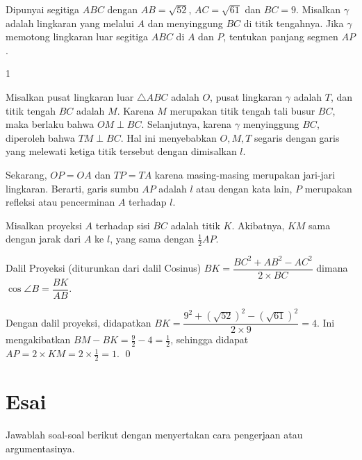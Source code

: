 \documentclass[11pt]{scrartcl}
\begin{document}
	\begin{soaljawab}
		Dipunyai segitiga $ABC$ dengan $AB = \sqrt{52}$, $AC=\sqrt{61}$ dan $BC = 9$. Misalkan $\gamma$
		adalah lingkaran yang melalui $A$ dan menyinggung $BC$ di titik tengahnya. Jika $\gamma$
		memotong lingkaran luar segitiga $ABC$ di $A$ dan $P$, tentukan panjang segmen $AP$.
		
		\begin{jawaban}
		1
		\end{jawaban}
		\begin{solusi}
		Misalkan pusat lingkaran luar $\triangle ABC$ adalah $O$, pusat lingkaran $\gamma$ adalah $T$, dan titik tengah $BC$ adalah $M$. Karena $M$ merupakan titik tengah tali busur $BC$, maka berlaku bahwa $OM \perp BC$. Selanjutnya, karena $\gamma$ menyinggung $BC$, diperoleh bahwa $TM \perp BC$. Hal ini menyebabkan $O,M,T$ segaris dengan garis yang melewati ketiga titik tersebut dengan dimisalkan $l$. 
		
		Sekarang, $OP=OA$ dan $TP=TA$ karena masing-masing merupakan jari-jari lingkaran. Berarti, garis sumbu $AP$ adalah $l$ atau dengan kata lain, $P$ merupakan refleksi atau pencerminan $A$ terhadap $l$. 
		
		Misalkan proyeksi $A$ terhadap sisi $BC$ adalah titik $K$. Akibatnya, $KM$ sama dengan jarak dari $A$ ke $l$, yang sama dengan $\frac{1}{2}AP$. 
		
		\begin{lemmarev}
		Dalil Proyeksi (diturunkan dari dalil Cosinus) $BK = \dfrac{BC^2+AB^2-AC^2}{2\times BC}$
		dimana $\cos \angle B = \dfrac{BK}{AB}$.
		\end{lemmarev}
		
		Dengan dalil proyeksi, didapatkan $BK = \dfrac{9^2+(\sqrt{52})^2-(\sqrt{61})^2}{2\times 9}=4$. Ini mengakibatkan $BM-BK = \frac{9}{2}-4=\frac{1}{2}$, sehingga didapat $AP=2\times KM=2 \times \frac{1}{2}=1$. \qed
		

		\end{solusi}
	\end{soaljawab}
	\newpage
	\section{Esai}
	Jawablah soal-soal berikut dengan menyertakan cara pengerjaan atau argumentasinya.
	
\end{document}
